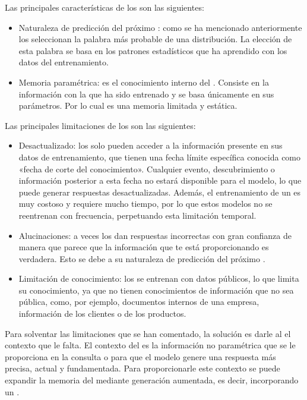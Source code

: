 Las principales características de los  son las siguientes:
\begin{itemize}
\tightlist
	\item Naturaleza de predicción del próximo : como se ha mencionado anteriormente los  seleccionan la palabra más probable de una distribución. La elección de esta palabra se basa en los patrones estadísticos que ha aprendido con los datos del entrenamiento.
	\item Memoria paramétrica: es el conocimiento interno del . Consiste en la información con la que ha sido entrenado y se basa únicamente en sus parámetros. Por lo cual es una memoria limitada y estática.
\end{itemize}

Las principales limitaciones de los  son las siguientes:
\begin{itemize}
\tightlist
	\item Desactualizado: los  solo pueden acceder a la información presente en sus datos de entrenamiento, que tienen una fecha límite específica conocida como «fecha de corte del conocimiento». Cualquier evento, descubrimiento o información posterior a esta fecha no estará disponible para el modelo, lo que puede generar respuestas desactualizadas. Además, el entrenamiento de un  es muy costoso y requiere mucho tiempo, por lo que estos modelos no se reentrenan con frecuencia, perpetuando esta limitación temporal. 
	\item Alucinaciones: a veces los  dan respuestas incorrectas con gran confianza de manera que parece que la información que te está proporcionando es verdadera. Esto se debe a su naturaleza de predicción del próximo . 
	\item Limitación de conocimiento: los  se entrenan con datos públicos, lo que limita su conocimiento, ya que no tienen conocimientos de información que no sea pública, como, por ejemplo, documentos internos de una empresa, información de los clientes o de los productos.
\end{itemize}

Para solventar las limitaciones que se han comentado, la solución es darle al  el contexto que le falta. El contexto del  es la información no paramétrica que se le proporciona en la consulta o  para que el modelo genere una respuesta más precisa, actual y fundamentada. Para proporcionarle este contexto se puede expandir la memoria del  mediante generación aumentada, es decir, incorporando un .

